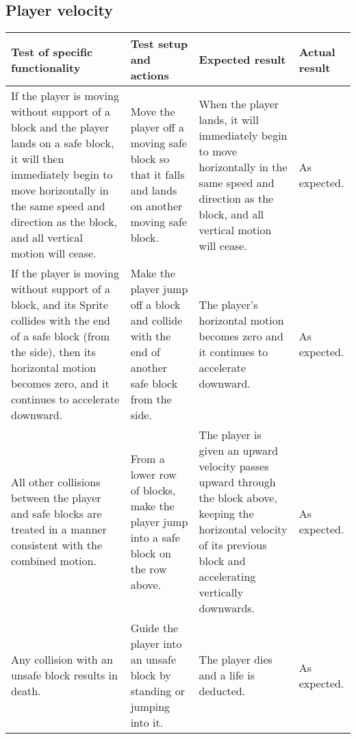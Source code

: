 \documentclass[10pt, titlepage]{article}
\newenvironment{testplan}[1]
{
\newcommand{\test}[4]{\midrule ##1 & ##2 & ##3 & ##4 \\}
\subsection{#1}
\begin{longtable}{L{0.3\textwidth}L{0.2\textwidth}L{0.25\textwidth}L{0.15\textwidth}}
\toprule
\textbf{Test of specific functionality} & \textbf{Test setup and actions} & \textbf{Expected result} & \textbf{Actual result} \\
}
{
\bottomrule
\end{longtable}
}
\begin{document}
\begin{testplan}{Player velocity}
\test{If the player is moving without support of a block and the player lands on a safe block, it will then immediately begin to move horizontally in the same speed and direction as the block, and all vertical motion will cease.}{Move the player off a moving safe block so that it falls and lands on another moving safe block.}{When the player lands, it will immediately begin to move horizontally in the same speed and direction as the block, and all vertical motion will cease.}{As expected.}
\test{If the player is moving without support of a block, and its Sprite collides with the end of a safe block (from the side), then its horizontal motion becomes zero, and it continues to accelerate downward.}{Make the player jump off a block and collide with the end of another safe block from the side.}{The player's horizontal motion becomes zero and it continues to accelerate downward.}{As expected.}
\test{All other collisions between the player and safe blocks are treated in a manner consistent with the combined motion.}{From a lower row of blocks, make the player jump into a safe block on the row above.}{The player is given an upward velocity passes upward through the block above, keeping the horizontal velocity of its previous block and accelerating vertically downwards.}{As expected.}
\test{Any collision with an unsafe block results in death.}{Guide the player into an unsafe block by standing or jumping into it.}{The player dies and a life is deducted.}{As expected.}
\end{testplan}
\end{document}
